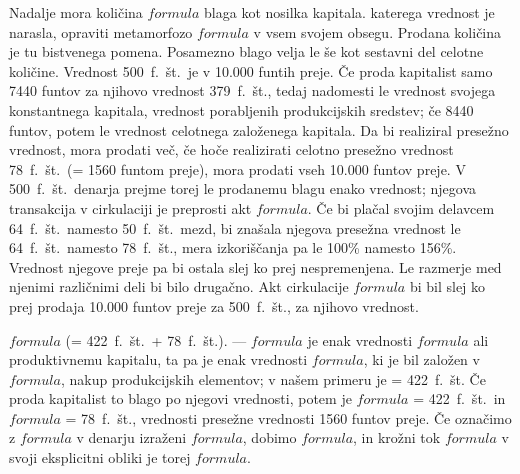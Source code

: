 \documentclass[a5paper]{scrbook}
\begin{document}
Nadalje mora količina \( formula \) blaga kot nosilka kapitala. katerega vrednost je narasla, opraviti metamorfozo \( formula \) v vsem svojem obsegu. Prodana količina je tu bistvenega pomena. Posamezno blago velja le še kot sestavni del celotne količine. Vrednost 500~f.~št.\ je v 10.000 funtih preje. Če proda kapitalist samo 7440 funtov za njihovo vrednost 379~f.~št., tedaj nadomesti le vrednost svojega konstantnega kapitala, vrednost porabljenih produkcijskih sredstev; če 8440 funtov, potem le vrednost celotnega založenega kapitala. Da bi realiziral presežno vrednost, mora prodati več, če hoče realizirati celotno presežno vrednost 78~f.~št.\ (= 1560 funtom preje), mora prodati vseh 10.000 funtov preje. V 500~f.~št.\ denarja prejme torej le prodanemu blagu enako vrednost; njegova transakcija v cirkulaciji je preprosti akt \( formula \). Če bi plačal svojim delavcem 64~f.~št.\ namesto 50~f.~št.\ mezd, bi znašala njegova presežna vrednost le 64~f.~št.\ namesto 78~f.~št., mera izkoriščanja pa le 100\% namesto 156\%. Vrednost njegove preje pa bi ostala slej ko prej nespremenjena. Le razmerje med njenimi različnimi deli bi bilo drugačno. Akt cirkulacije \( formula \) bi bil slej ko prej prodaja 10.000 funtov preje za 500~f.~št., za njihovo vrednost.

\( formula \) (= 422~f.~št.\ + 78~f.~št.). --- \( formula \) je enak vrednosti \( formula \) ali produktivnemu kapitalu, ta pa je enak vrednosti \( formula \), ki je bil založen v \( formula \), nakup produkcijskih elementov; v našem primeru je = 422~f.~št. Če proda kapitalist to blago po njegovi vrednosti, potem je \( formula \) = 422~f.~št.\ in \( formula \) = 78~f.~št., vrednosti presežne vrednosti 1560 funtov preje. Če označimo z \( formula \) v denarju izraženi \( formula \), dobimo \( formula \), in krožni tok \( formula \) v svoji eksplicitni obliki je torej \( formula \).
\end{document}
